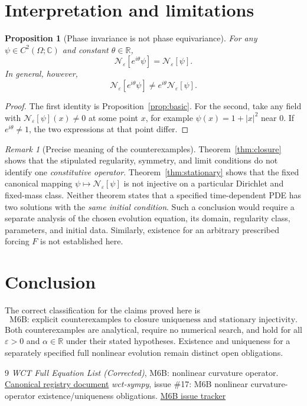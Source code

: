 \documentclass[11pt]{article}
\newtheorem{proposition}[theorem]{Proposition}
\theoremstyle{remark}
\newtheorem{remark}[theorem]{Remark}
\newcommand{\Ncurv}{\mathcal{N}_{\varepsilon}}
\newcommand{\R}{\mathbb{R}}
\newcommand{\C}{\mathbb{C}}
\begin{document}
\section{Interpretation and limitations}

\begin{proposition}[Phase invariance is not phase equivariance]
For any $\psi\in C^2(\Omega;\C)$ and constant $\theta\in\R$,
\[
\Ncurv[e^{i\theta}\psi]=\Ncurv[\psi].
\]
In general, however,
\[
\Ncurv[e^{i\theta}\psi]\neq
 e^{i\theta}\Ncurv[\psi].
\]
\end{proposition}
\begin{proof}
The first identity is Proposition~\ref{prop:basic}. For the second,
take any field with $\Ncurv[\psi](x)\neq0$ at some point $x$, for
example $\psi(x)=1+|x|^2$ near $0$. If $e^{i\theta}\neq1$, the two
expressions at that point differ.
\end{proof}

\begin{remark}[Precise meaning of the counterexamples]
Theorem~\ref{thm:closure} shows that the stipulated regularity,
symmetry, and limit conditions do not identify one \emph{constitutive
operator}. Theorem~\ref{thm:stationary} shows that the fixed canonical
mapping $\psi\mapsto\Ncurv[\psi]$ is not injective on a particular
Dirichlet and fixed-mass class. Neither theorem states that a
specified time-dependent PDE has two solutions with the \emph{same
initial condition}. Such a conclusion would require a separate
analysis of the chosen evolution equation, its domain, regularity
class, parameters, and initial data. Similarly, existence for an
arbitrary prescribed forcing $F$ is not established here.
\end{remark}

\section{Conclusion}

The correct classification for the claims proved here is
\[
\boxed{\text{M6B: explicit counterexamples to closure uniqueness
and stationary injectivity.}}
\]
Both counterexamples are analytical, require no numerical search, and
hold for all $\varepsilon>0$ and $\alpha\in\R$ under their stated
hypotheses. Existence and uniqueness for a separately specified full
nonlinear evolution remain distinct open obligations.

\begin{thebibliography}{9}
\emph{WCT Full Equation List (Corrected)}, M6B: nonlinear curvature
operator. \href{https://github.com/rickyjreyes/geometry_of_resonance/blob/main/WCT_FULL_EQUATION_LIST_CORRECTED.md}{Canonical registry document}
\emph{wct-sympy}, issue \#17: M6B nonlinear curvature-operator
existence/uniqueness obligations.
\href{https://github.com/rickyjreyes/wct-sympy/issues/17}{M6B issue tracker}
\end{thebibliography}
\end{document}
